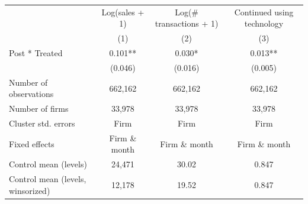 \begin{tabular}[t]{lccc}
\toprule
  & Log(sales + 1) & Log(\# transactions + 1) & Continued using technology\\
& (1) & (2) & (3)\\
\midrule
Post * Treated & 0.101** & 0.030* & 0.013**\\
 & (0.046) & (0.016) & (0.005)\\
\midrule
Number of observations & 662,162 & 662,162 & 662,162\\
Number of firms & 33,978 & 33,978 & 33,978\\
Cluster std. errors & Firm & Firm & Firm\\
Fixed effects & Firm \& month & Firm \& month & Firm \& month\\
Control mean (levels) & 24,471 & 30.02 & 0.847\\
Control mean (levels, winsorized) & 12,178 & 19.52 & 0.847\\
\bottomrule
\end{tabular}

